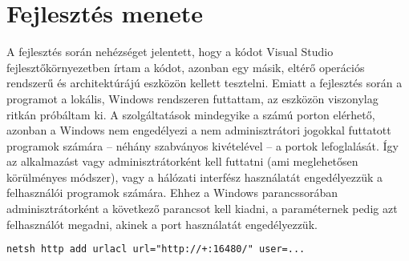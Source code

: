 \section{Fejlesztés menete} \label{subs:fejlesztes_menete}

A fejlesztés során nehézséget jelentett, hogy a kódot Visual Studio fejlesztőkörnyezetben írtam a kódot, azonban egy másik, eltérő operációs rendszerű és architektúrájú eszközön kellett tesztelni. Emiatt a fejlesztés során a programot a lokális, Windows rendszeren futtattam, az eszközön viszonylag ritkán próbáltam ki. A szolgáltatások mindegyike a  számú porton elérhető, azonban a Windows nem engedélyezi a nem adminisztrátori jogokkal futtatott programok számára -- néhány szabványos kivételével -- a portok lefoglalását. Így az alkalmazást vagy adminisztrátorként kell futtatni (ami meglehetősen körülményes módszer), vagy a hálózati interfész használatát engedélyezzük a felhasználói programok számára. Ehhez a Windows parancssorában adminisztrátorként a következő parancsot kell kiadni, a  paraméternek pedig azt felhasználót megadni, akinek a port használatát engedélyezzük.

\begin{mdframed}[backgroundcolor=gray!20]
\begin{small}
\begin{lstlisting}[language=XML]
netsh http add urlacl url="http://+:16480/" user=...
\end{lstlisting}
\end{small}
\end{mdframed}

